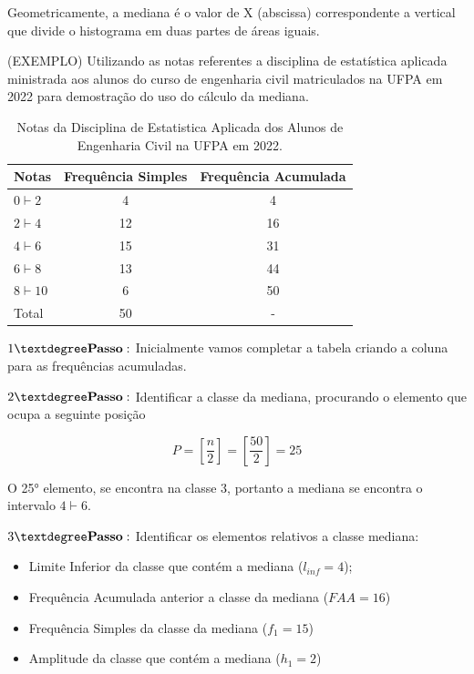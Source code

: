 Geometricamente, a mediana é o valor de X (abscissa) correspondente a vertical que divide o histograma em duas partes de áreas iguais.\vskip0.3cm


(EXEMPLO) Utilizando as notas referentes a disciplina de estatística aplicada ministrada aos alunos do curso de engenharia civil matriculados na UFPA em 2022 para demostração do uso do cálculo da mediana.



  \begin{table}[!htb]
    \centering
    {
    \caption{Notas da Disciplina de Estatistica Aplicada dos Alunos de Engenharia Civil na UFPA em 2022.}
    \label{exemplomediana}
    \vspace{0.1cm}
\begin{tabular}{l|c|c}
  \hline\hline
  Notas          & Frequência Simples & Frequência Acumulada \\
  \hline\hline
  $0 \vdash 2  $ & 4          & 4                    \\
  $2 \vdash 4  $ & 12         & 16                   \\
  $4 \vdash 6  $ & 15         & 31                   \\
  $6 \vdash 8  $ & 13         & 44                   \\
  $8 \vdash 10 $ & 6          & 50                   \\
  \hline\hline
  Total & 50                  &  - \\
    \hline\hline
\end{tabular}}
\end{table}

$1° \mbox{\textbf{Passo}}:$ Inicialmente vamos completar a tabela criando a coluna para as frequências acumuladas.\vskip0.3cm

$2° \mbox{\textbf{Passo}}:$ Identificar a classe da mediana, procurando o elemento que ocupa a seguinte posição

$$ P= \left[ \frac{n}{2} \right] = \left[ \frac{50}{2} \right] = 25 $$

O 25° elemento, se encontra na classe 3, portanto a mediana se encontra o intervalo $ 4 \vdash 6$.

\vskip0.3cm

$3° \mbox{\textbf{Passo}}:$ Identificar os elementos relativos a classe mediana:

\begin{itemize}
  \item Limite Inferior da classe que contém a mediana ($l_{inf}=4$);
  \item Frequência Acumulada anterior a classe da mediana ($FAA=16$)
  \item Frequência Simples da classe da mediana ($f_{1}=15$)
  \item Amplitude da classe que contém a mediana ($h_{1}=2$)
\end{itemize}


